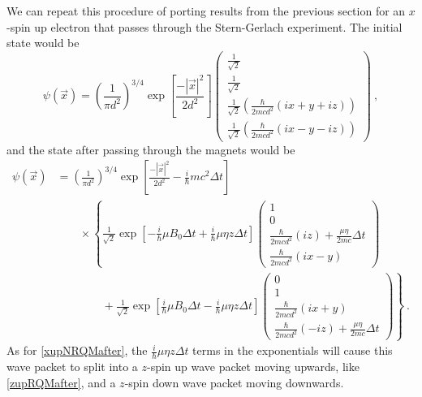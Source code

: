 \documentclass[12pt,secnumarabic,amsmath,amssymb,balancelastpage,nofootinbib]{article}
\begin{document}
We can repeat this procedure of porting results from the previous section for an $x$-spin up electron that passes through the Stern-Gerlach experiment.  The initial state would be
\begin{equation}
\psi(\vec{x}) = \left(\frac{1}{\pi d^2}\right)^{3/4}  \exp\left[\frac{-|\vec{x}|^2}{2 d^2}\right] \left(\begin{matrix} \frac{1}{\sqrt{2}}\\\frac{1}{\sqrt{2}}\\ \frac{1}{\sqrt{2}}\left(\frac{\hbar}{2 m c d^2}(ix+y+iz)\right) \\ \frac{1}{\sqrt{2}} \left(\frac{\hbar}{2 m c d^2}(i x-y-iz)\right)\end{matrix}\right)
\ ,
\label{xupRQM}
\end{equation}
and the state after passing through the magnets would be
\begin{align}
\psi(\vec{x}) &= \left(\frac{1}{\pi d^2}\right)^{3/4}  \exp\left[\frac{-|\vec{x}|^2}{2 d^2} -\frac{i}{\hbar} m c^2 \Delta t\right]
\nonumber
\\
&\quad\quad\times\left\{
 \frac{1}{\sqrt{2}}\exp\left[-\frac{i}{\hbar}\mu B_0 \Delta t + \frac{i}{\hbar}\mu \eta z \Delta t\right]  \left(\begin{matrix}
 1 \\
 0 \\
 \frac{\hbar}{2 m c d^2}(iz) + \frac{\mu \eta}{2 m c} \Delta t \\
 \frac{\hbar}{2 m c d^2}(i x-y)
 \end{matrix}\right)\right.
 \nonumber
\\
&\quad\quad\quad\quad+
\left.
 \frac{1}{\sqrt{2}}\exp\left[\frac{i}{\hbar}\mu B_0 \Delta t - \frac{i}{\hbar}\mu \eta z \Delta t\right]  \left(\begin{matrix}
 0 \\
 1 \\
 \frac{\hbar}{2 m c d^2}(ix+y)  \\
 \frac{\hbar}{2 m c d^2}(-iz) + \frac{\mu \eta}{2 m c} \Delta t
 \end{matrix}\right)
\right\}
\ .
\label{xupRQMafter}
\end{align}
As for \eqref{xupNRQMafter}, the $\frac{i}{\hbar}\mu \eta z \Delta t$ terms in the exponentials will cause this wave packet to split into a $z$-spin up wave packet moving upwards, like \eqref{zupRQMafter}, and a $z$-spin down wave packet moving downwards.
\end{document}

